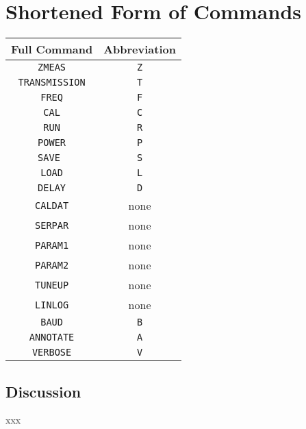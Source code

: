 \section{Shortened Form of Commands}
\label{subsect:SerShort}
\begin{center}
\begin{tabular}{|c||c|} \hline
\textbf{Full Command}   &  \textbf{Abbreviation}  \\ \hline \hline
\texttt{ZMEAS}    &   \texttt{Z} \\ \hline
\texttt{TRANSMISSION}   &   \texttt{T} \\ \hline
\texttt{FREQ}   &   \texttt{F} \\ \hline
\texttt{CAL}   &   \texttt{C} \\ \hline
\texttt{RUN}   &  \texttt{R} \\ \hline
\texttt{POWER}    &  \texttt{P}  \\ \hline
\texttt{SAVE }   &   \texttt{S}  \\ \hline
\texttt{LOAD}    &   \texttt{L}  \\ \hline
\texttt{DELAY}    &   \texttt{D}  \\ \hline
\texttt{CALDAT}   &    none \\ \hline
\texttt{SERPAR}   &   none   \\ \hline
\texttt{PARAM1}   &   none  \\ \hline
\texttt{PARAM2}   &   none  \\ \hline
\texttt{TUNEUP}   &   none  \\ \hline
\texttt{LINLOG}    &    none  \\ \hline
\texttt{BAUD}        &   \texttt{B}  \\ \hline
\texttt{ANNOTATE}   &   \texttt{A}  \\ \hline
\texttt{VERBOSE}     &   \texttt{V}  \\ \hline

\end{tabular}
\end{center}

\subsection{Discussion}
xxx
